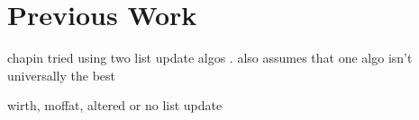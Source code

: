 \documentclass[a4paper]{scrreprt}
\begin{document}

\section{Previous Work}

chapin tried using two list update algos
\cite{chapin2000switching,chapin2001diss}. also assumes that one algo isn't
universally the best

wirth, moffat, altered or no list update \cite{wirth2001ranks}



\end{document}
